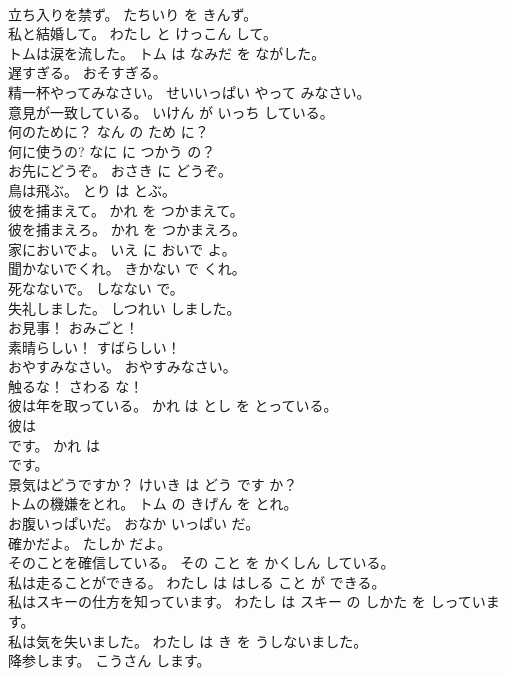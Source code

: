 \documentclass[8pt]{extreport}
\begin{document}
\begin{CJK}{UTF8}{min}
\\	立ち入りを禁ず。	たちいり を きんず。	
\\	私と結婚して。	わたし と けっこん して。	
\\	トムは涙を流した。	トム は なみだ を ながした。	
\\	遅すぎる。	おそすぎる。	
\\	精一杯やってみなさい。	せいいっぱい やって みなさい。	
\\	意見が一致している。	いけん が いっち している。	
\\	何のために？	なん の ため に？	
\\	何に使うの?	なに に つかう の？	
\\	お先にどうぞ。	おさき に どうぞ。	
\\	鳥は飛ぶ。	とり は とぶ。	
\\	彼を捕まえて。	かれ を つかまえて。	
\\	彼を捕まえろ。	かれ を つかまえろ。	
\\	家においでよ。	いえ に おいで よ。	
\\	聞かないでくれ。	きかない で くれ。	
\\	死なないで。	しなない で。	
\\	失礼しました。	しつれい しました。	
\\	お見事！	おみごと！	
\\	素晴らしい！	すばらしい！	
\\	おやすみなさい。	おやすみなさい。	
\\	触るな！	さわる な！	
\\	彼は年を取っている。	かれ は とし を とっている。	
\\	彼は
\\	です。	かれ は 
\\	です。	
\\	景気はどうですか？	けいき は どう です か？	
\\	トムの機嫌をとれ。	トム の きげん を とれ。	
\\	お腹いっぱいだ。	おなか いっぱい だ。	
\\	確かだよ。	たしか だよ。	
\\	そのことを確信している。	その こと を かくしん している。	
\\	私は走ることができる。	わたし は はしる こと が できる。	
\\	私はスキーの仕方を知っています。	わたし は スキー の しかた を しっています。	
\\	私は気を失いました。	わたし は き を うしないました。	
\\	降参します。	こうさん します。	

\end{CJK}
\end{document}
